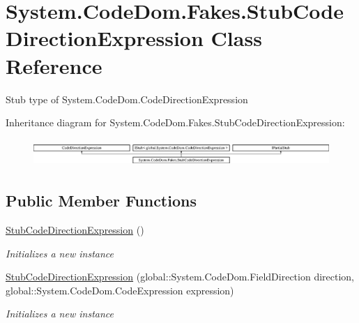 \hypertarget{class_system_1_1_code_dom_1_1_fakes_1_1_stub_code_direction_expression}{\section{System.\-Code\-Dom.\-Fakes.\-Stub\-Code\-Direction\-Expression Class Reference}
\label{class_system_1_1_code_dom_1_1_fakes_1_1_stub_code_direction_expression}
}


Stub type of System.\-Code\-Dom.\-Code\-Direction\-Expression 


Inheritance diagram for System.\-Code\-Dom.\-Fakes.\-Stub\-Code\-Direction\-Expression\-:\begin{figure}[H]
\begin{center}
\leavevmode
\includegraphics[height=1.048689cm]{class_system_1_1_code_dom_1_1_fakes_1_1_stub_code_direction_expression}
\end{center}
\end{figure}
\subsection*{Public Member Functions}
\begin{DoxyCompactItemize}
\item 
\hyperlink{class_system_1_1_code_dom_1_1_fakes_1_1_stub_code_direction_expression_adf5bc0d6d738a7039bcc6e1dbfc694f0}{Stub\-Code\-Direction\-Expression} ()
\begin{DoxyCompactList}\small\item\em Initializes a new instance\end{DoxyCompactList}\item 
\hyperlink{class_system_1_1_code_dom_1_1_fakes_1_1_stub_code_direction_expression_a17cde2f39d0d49f0a0a5810358624745}{Stub\-Code\-Direction\-Expression} (global\-::\-System.\-Code\-Dom.\-Field\-Direction direction, global\-::\-System.\-Code\-Dom.\-Code\-Expression expression)
\begin{DoxyCompactList}\small\item\em Initializes a new instance\end{DoxyCompactList}\end{DoxyCompactItemize}
